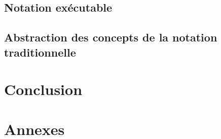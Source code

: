 \documentclass[utf8,final]{stageM2R} %
\begin{document}
	\section{Notation exécutable}
	\label{sec:notationExecutable}
	
	\newpage	
		
	\section{Abstraction des concepts de la notation traditionnelle}
	\label{sec:abstractionConcepts}
	


	
\clearpage
\chapter{Conclusion}


\printbibliography

\listoffigures

\printglossary

\appendix
\chapter{Annexes}

\end{document}
